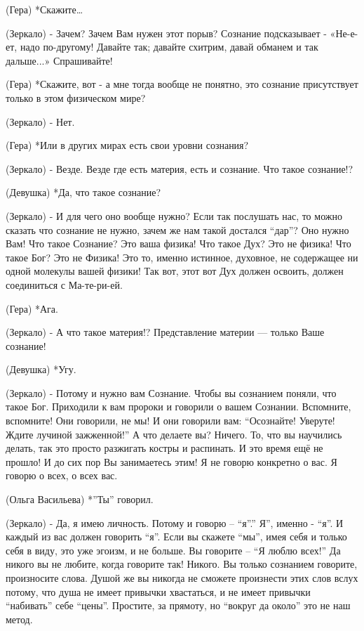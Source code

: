 (Гера) *Скажите…

(Зеркало) - Зачем? Зачем Вам нужен этот порыв? Сознание подсказывает - «Не-е-ет, надо по-другому! Давайте так; давайте схитрим, давай обманем и так дальше...» Спрашивайте!

 (Гера) *Скажите, вот - а мне тогда вообще не понятно, это сознание присутствует только в этом физическом мире? 

(Зеркало) -  Нет. 

(Гера) *Или в других мирах есть свои уровни сознания?

(Зеркало) - Везде. Везде где есть материя, есть и сознание. Что такое сознание!?

(Девушка) *Да, что такое сознание?

(Зеркало) - И для чего оно вообще нужно? Если так послушать нас,  то можно сказать что сознание не нужно, зачем же нам такой достался “дар”? Оно нужно Вам! Что такое Сознание?  Это ваша физика! Что такое Дух? Это не физика! Что такое Бог? Это не Физика! Это то, именно истинное, духовное, не содержащее ни одной молекулы вашей физики! Так вот, этот вот Дух должен освоить, должен соединиться с Ма-те-ри-ей. 

(Гера) *Ага.

(Зеркало) - А что такое материя!? Представление материи  — только Ваше сознание! 

(Девушка) *Угу.

(Зеркало)  -  Потому и нужно вам Сознание.  Чтобы вы сознанием поняли, что такое Бог. Приходили к вам пророки и говорили о вашем Сознании. Вспомните, вспомните! Они говорили, не мы! И они говорили вам: “Осознайте! Уверуте! Ждите лучиной зажженной!” А что делаете вы? Ничего. То, что вы научились делать, так это просто разжигать костры и распинать. И это время ещё не прошло!  И до сих пор Вы занимаетесь этим! Я не говорю конкретно о вас. Я говорю о всех, о всех вас.  

(Ольга Васильева) *”Ты” говорил.

(Зеркало) - Да, я имею личность. Потому и говорю – “я”.” Я”, именно - “я”. И каждый из вас должен говорить “я”. Если вы скажете “мы”, имея себя и только себя в виду, это уже эгоизм, и не больше. Вы говорите – “Я люблю всех!” Да никого вы не любите, когда говорите так! Никого. Вы только сознанием говорите, произносите слова. Душой же вы никогда не сможете произнести этих слов вслух потому, что душа не имеет привычки хвастаться, и не имеет привычки “набивать” себе “цены”. Простите, за прямоту, но “вокруг да около” это не наш метод. 

